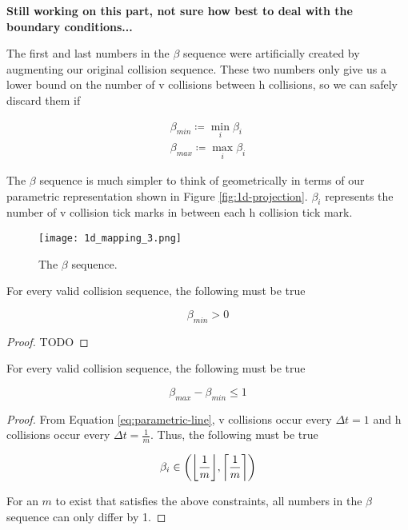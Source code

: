 \textbf{Still working on this part, not sure how best to deal with the boundary conditions...}

The first and last numbers in the $\beta$ sequence were artificially created by augmenting our original collision sequence. These two numbers only give us a lower bound on the number of v collisions between h collisions, so we can safely discard them if 

\begin{definition}
	\begin{align}
		\beta_{min} \coloneqq \min_i \beta_i\\
		\beta_{max} \coloneqq \max_i \beta_i
	\end{align}
\end{definition}

The $\beta$ sequence is much simpler to think of geometrically in terms of our parametric representation shown in Figure \ref{fig:1d-projection}. $\beta_i$ represents the number of v collision tick marks in between each h collision tick mark.

\begin{figure}[H]
  \begin{center}
    \texttt{[image: 1d\_mapping\_3.png]}
  \end{center}
  \vspace{-.2in} %
  \caption{\label{fig:beta-sequence} The $\beta$ sequence.}
\end{figure}

\begin{lemma}\label{lemma:beta_pos}
	For every valid collision sequence, the following must be true

	\begin{equation}
		\beta_{min} > 0
	\end{equation}
\end{lemma}

\begin{proof}
	TODO
\end{proof}

\begin{theorem}\label{thm:beta_exremum}
	For every valid collision sequence, the following must be true
	
	\begin{equation}
		\beta_{max} - \beta_{min} \le 1
	\end{equation}
\end{theorem}

\begin{proof}

From Equation \ref{eq:parametric-line}, v collisions occur every $\Delta t = 1$ and h collisions occur every $\Delta t = \frac{1}{m}$. Thus, the following must be true

\begin{equation}
	\beta_i \in \paren{\floor{\frac{1}{m}}, \ceil{\frac{1}{m}}}
\end{equation}

For an $m$ to exist that satisfies the above constraints, all numbers in the $\beta$ sequence can only differ by 1.

\end{proof}

